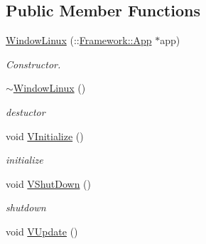 \subsection*{Public Member Functions}
\begin{DoxyCompactItemize}
\item 
\hypertarget{classPlatform_1_1WindowLinux_a3612876a93f58ccb9e2b4dc9765daee1}{
\hyperlink{classPlatform_1_1WindowLinux_a3612876a93f58ccb9e2b4dc9765daee1}{WindowLinux} (::\hyperlink{classFramework_1_1App}{Framework::App} $\ast$app)}
\label{classPlatform_1_1WindowLinux_a3612876a93f58ccb9e2b4dc9765daee1}

\begin{DoxyCompactList}\small\item\em Constructor. \item\end{DoxyCompactList}\item 
\hypertarget{classPlatform_1_1WindowLinux_a853aef9c3434a3f56748a467abcee833}{
\hyperlink{classPlatform_1_1WindowLinux_a853aef9c3434a3f56748a467abcee833}{$\sim$WindowLinux} ()}
\label{classPlatform_1_1WindowLinux_a853aef9c3434a3f56748a467abcee833}

\begin{DoxyCompactList}\small\item\em destuctor \item\end{DoxyCompactList}\item 
\hypertarget{classPlatform_1_1WindowLinux_a04971857d526025c8860b99892620490}{
void \hyperlink{classPlatform_1_1WindowLinux_a04971857d526025c8860b99892620490}{VInitialize} ()}
\label{classPlatform_1_1WindowLinux_a04971857d526025c8860b99892620490}

\begin{DoxyCompactList}\small\item\em initialize \item\end{DoxyCompactList}\item 
\hypertarget{classPlatform_1_1WindowLinux_aea99a78cb7e649a16f012f9aac9d9501}{
void \hyperlink{classPlatform_1_1WindowLinux_aea99a78cb7e649a16f012f9aac9d9501}{VShutDown} ()}
\label{classPlatform_1_1WindowLinux_aea99a78cb7e649a16f012f9aac9d9501}

\begin{DoxyCompactList}\small\item\em shutdown \item\end{DoxyCompactList}\item 
\hypertarget{classPlatform_1_1WindowLinux_aaefac050784fcdfeb1315c4c53e80150}{
void \hyperlink{classPlatform_1_1WindowLinux_aaefac050784fcdfeb1315c4c53e80150}{VUpdate} ()}
\label{classPlatform_1_1WindowLinux_aaefac050784fcdfeb1315c4c53e80150}


\end{DoxyCompactItemize}
